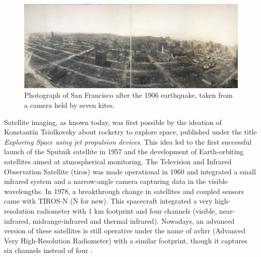 \begin{figure}[!ht]
	\includegraphics{figs/introduction/san_francisco_kitecamera.jpg}
	\caption{Photograph of San Francisco after the 1906 earthquake, taken from a camera held by seven kites. }
    \label{fig:san_francisco_kite}
\end{figure}

Satellite imaging, as known today, was first possible by the ideation of Konstantín Tsiolkovsky about rocketry to explore space, published under the title \textit{Exploring Space using jet propulsion devices}. This idea led to the first successful launch of the Sputnik satellite in 1957 and the development of Earth-orbiting satellites aimed at atmospherical monitoring. The Television and Infrared Observation Satellite (\acrshort{tiros}) was made operational in 1960 and integrated a small infrared system and a narrow-angle camera capturing data in the visible wavelengths. In 1978, a breakthrough change in satellites and coupled sensors came with TIROS-N (N for new). This spacecraft integrated a very high-resolution radiometer with 1 \si{\kilo\meter} footprint and four channels (visible, near-infrared, midrange-infrared and thermal infrared). Nowadays, an advanced version of these satellites is still operative under the name of \acrshort{avhrr} (Advanced Very High-Resolution Radiometer) with a similar footprint, though it captures six channels instead of four \cite{national_oceanic_and_atmospheric_administration_avhrr3_nodate}.   


